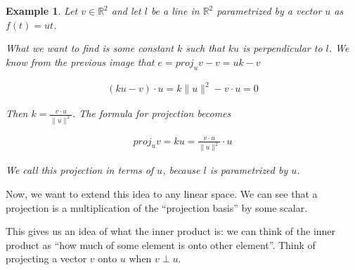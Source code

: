 \documentclass{book}
\newtheorem{example}{Example}[section]
\begin{document}
\begin{example}
    Let $v\in\mathbb{R}^{2}$ and let $l$ be a line
    in $\mathbb{R}^{2}$ parametrized by a vector $u$ as $f(t)=ut$.

    \begin{center}
    \end{center}

    What we want to find is some constant $k$ such that $ku$ is perpendicular to
    $l$. We know from the previous image that $e=proj_u v - v = uk-v$

    \begin{equation*}
        \begin{split}
            (ku-v)\cdot u = k\|u\|^{2} - v\cdot u = 0
        \end{split}
    \end{equation*}

    Then $k=\frac{v\cdot u}{\|u\|^{2}}$. The formula for projection becomes

    \begin{equation}
        \begin{split}
            proj_u v = ku = \frac{v\cdot u}{\|u\|^{2}}\cdot u
        \end{split}
    \end{equation}

    We call this projection in terms of $u$, because $l$ is parametrized by $u$.
\end{example}

Now, we want to extend this idea to any linear space. We can see that a
projection is a multiplication of the ``projection basis'' by some scalar.

This gives us an idea of what the inner product is: we can think of the inner
product as ``how much of some element is onto other element''. Think of
projecting a vector $v$ onto $u$ when $v\perp u$.
\end{document}
